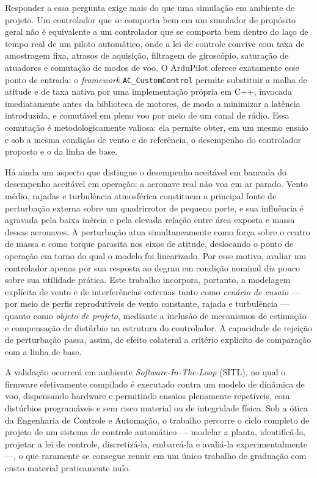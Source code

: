 \documentclass[12pt,a4paper]{article}
\begin{document}
Responder a essa pergunta exige mais do que uma simulação em ambiente de projeto.
Um controlador que se comporta bem em um simulador de propósito geral não é
equivalente a um controlador que se comporta bem dentro do laço de tempo real de um
piloto automático, onde a lei de controle convive com taxa de amostragem fixa,
atrasos de aquisição, filtragem de giroscópio, saturação de atuadores e comutação de
modos de voo. O ArduPilot oferece exatamente esse ponto de entrada: o
\emph{framework} \texttt{AC\_CustomControl} permite substituir a malha de atitude e
de taxa nativa por uma implementação própria em C++, invocada imediatamente antes da
biblioteca de motores, de modo a minimizar a latência introduzida, e comutável em
pleno voo por meio de um canal de rádio. Essa comutação é metodologicamente valiosa:
ela permite obter, em um mesmo ensaio e sob a mesma condição de vento e de
referência, o desempenho do controlador proposto e o da linha de base.

Há ainda um aspecto que distingue o desempenho aceitável em bancada do desempenho
aceitável em operação: a aeronave real não voa em ar parado. Vento médio, rajadas e
turbulência atmosférica constituem a principal fonte de perturbação externa sobre um
quadrirrotor de pequeno porte, e sua influência é agravada pela baixa inércia e pela
elevada relação entre área exposta e massa dessas aeronaves. A perturbação atua
simultaneamente como força sobre o centro de massa e como torque parasita nos eixos
de atitude, deslocando o ponto de operação em torno do qual o modelo foi linearizado.
Por esse motivo, avaliar um controlador apenas por sua resposta ao degrau em condição
nominal diz pouco sobre sua utilidade prática. Este trabalho incorpora, portanto, a
modelagem explícita de vento e de interferências externas tanto como \emph{cenário de
ensaio} --- por meio de perfis reprodutíveis de vento constante, rajada e turbulência
--- quanto como \emph{objeto de projeto}, mediante a inclusão de mecanismos de
estimação e compensação de distúrbio na estrutura do controlador. A capacidade de
rejeição de perturbação passa, assim, de efeito colateral a critério explícito de
comparação com a linha de base.

A validação ocorrerá em ambiente \emph{Software-In-The-Loop} (SITL), no qual o
firmware efetivamente compilado é executado contra um modelo de dinâmica de voo,
dispensando hardware e permitindo ensaios plenamente repetíveis, com distúrbios
programáveis e sem risco material ou de integridade física. Sob a ótica da
Engenharia de Controle e Automação, o trabalho percorre o ciclo completo de projeto
de um sistema de controle automático --- modelar a planta, identificá-la, projetar a
lei de controle, discretizá-la, embarcá-la e avaliá-la experimentalmente ---, o que
raramente se consegue reunir em um único trabalho de graduação com custo material
praticamente nulo.
\end{document}
